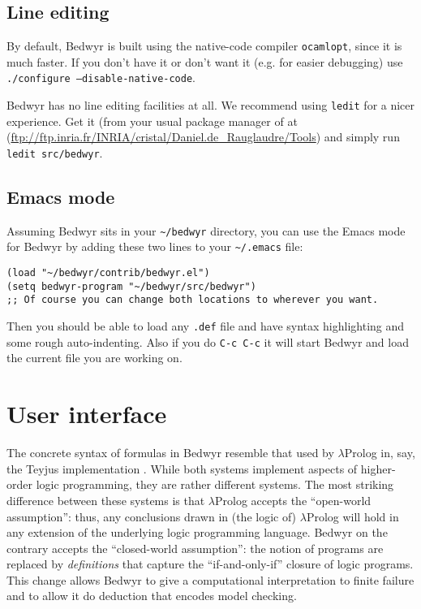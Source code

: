 \documentclass{article}
\begin{document}
\subsection{Line editing}

By default, Bedwyr is built using the native-code compiler \texttt{ocamlopt},
since it is much faster. If you don't have it or don't want it (e.g.
for easier debugging) use \texttt{./configure --disable-native-code}.

Bedwyr has no line editing facilities at all. We recommend using \texttt{ledit}
for a nicer experience. Get it (from your usual package manager of at
(\url{ftp://ftp.inria.fr/INRIA/cristal/Daniel.de_Rauglaudre/Tools})
and simply run \texttt{ledit src/bedwyr}.

\subsection{Emacs mode}

Assuming Bedwyr sits in your \verb.~/bedwyr. directory,
you can use the Emacs mode for Bedwyr by adding these two lines to your
\verb,~/.emacs, file:
\begin{verbatim}
(load "~/bedwyr/contrib/bedwyr.el")
(setq bedwyr-program "~/bedwyr/src/bedwyr")
;; Of course you can change both locations to wherever you want.
\end{verbatim}

Then you should be able to load any \verb:.def: file
and have syntax highlighting and some rough auto-indenting.
Also if you do \verb.C-c C-c. it will start Bedwyr
and load the current file you are working on.

\section{User interface}
\label{sec:interface}

The concrete syntax of formulas in Bedwyr resemble that used by
$\lambda$Prolog in, say, the Teyjus implementation
\cite{nadathur99cade}.  While both systems implement aspects of
higher-order logic programming, they are rather different systems.
The most striking difference between these systems is that
$\lambda$Prolog accepts the ``open-world assumption'': thus, any
conclusions drawn in (the logic of) $\lambda$Prolog will hold in any
extension of the underlying logic programming language.  Bedwyr on the
contrary accepts the ``closed-world assumption'': the notion of
programs are replaced by {\em definitions} that capture the
``if-and-only-if'' closure of logic programs.  This change allows
Bedwyr to give a computational interpretation to finite failure and to
allow it do deduction that encodes model checking.
\end{document}

